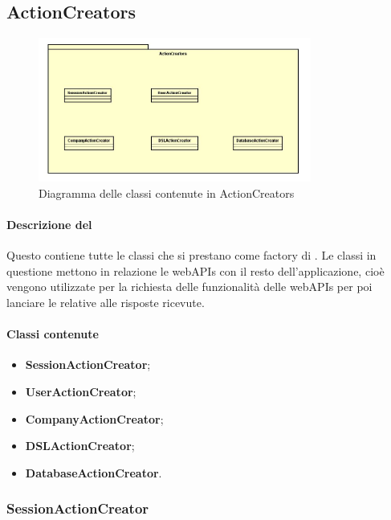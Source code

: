 \subsection{ActionCreators}

\begin{figure}[h]
\centering
\includegraphics[width=0.8\textwidth]{res/sections/imgs/actioncreator-diagram.jpg}
\caption{Diagramma delle classi contenute in ActionCreators}
\end{figure}

\paragraph*{Descrizione del }
Questo  contiene tutte le classi che si prestano come factory di . Le classi in questione mettono in relazione le webAPIs con il resto dell'applicazione, cioè vengono utilizzate per la richiesta delle funzionalità delle webAPIs per poi lanciare le  relative alle risposte ricevute.

\paragraph*{Classi contenute}
\begin{itemize}
\item \textbf{SessionActionCreator};
\item \textbf{UserActionCreator};
\item \textbf{CompanyActionCreator};
\item \textbf{DSLActionCreator};
\item \textbf{DatabaseActionCreator}.
\end{itemize}

\subsubsection{SessionActionCreator}

